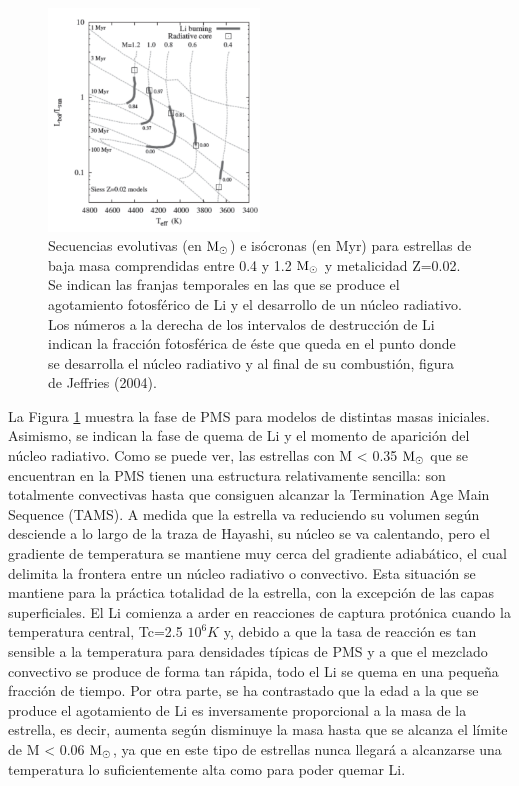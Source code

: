 \begin{figure}
	\centering
	\includegraphics[width=0.5\textwidth]{img/tesis/isochrones.pdf}
	\caption {Secuencias evolutivas (en $\mathrm{M}_\odot$) e isócronas (en Myr) para estrellas de baja masa comprendidas entre 0.4 y 1.2 $\mathrm{M}_\odot$ y metalicidad Z=0.02. Se indican las franjas temporales en las que se produce el agotamiento fotosférico de Li y el desarrollo de un núcleo radiativo. Los números a la derecha de los intervalos de destrucción de Li indican la fracción fotosférica de éste que queda en el punto donde se desarrolla el núcleo radiativo y al final de su combustión, figura de Jeffries (2004).}
	\label{fig:isocrhones}
\end{figure}

La Figura \ref{fig:isocrhones} muestra la fase de PMS para modelos de distintas masas iniciales. Asimismo, se indican la fase de quema de Li y el momento de aparición del núcleo radiativo. Como se puede ver, las estrellas con M < 0.35 $\mathrm{M}_\odot$ que se encuentran en la PMS tienen una estructura relativamente sencilla: son totalmente convectivas hasta que consiguen alcanzar la Termination Age Main Sequence (TAMS). A medida que la estrella va reduciendo su volumen según desciende a lo largo de la traza de Hayashi, su núcleo se va calentando, pero el gradiente de temperatura se mantiene muy cerca del gradiente adiabático, el cual delimita la frontera entre un núcleo radiativo o convectivo. Esta situación se mantiene para la práctica totalidad de la estrella, con la excepción de las capas superficiales. El Li comienza a arder en reacciones de captura protónica cuando la temperatura central, Tc=2.5 $10^{6} K$ y, debido a que la tasa de reacción es tan sensible a la temperatura para densidades típicas de PMS \cite{Randich2006} y a que el mezclado convectivo se produce de forma tan rápida, todo el Li se quema en una pequeña fracción de tiempo. Por otra parte, se ha contrastado que la edad a la que se produce el agotamiento de Li es inversamente proporcional a la masa de la estrella, es decir, aumenta según disminuye la masa hasta que se alcanza el límite de M < 0.06 $\mathrm{M}_\odot$, ya que en este tipo de estrellas nunca llegará a alcanzarse una temperatura lo suficientemente alta como para poder quemar Li.\par

